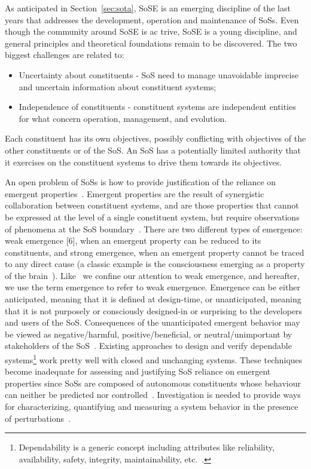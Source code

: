 As anticipated in Section~\ref{sec:sota}, SoSE is an emerging discipline of the last years that addresses the development,
operation and maintenance of SoSs. Even though the community around SoSE is ac trive, SoSE is a
young discipline, and general principles and theoretical foundations remain to be discovered. The two
biggest challenges are related to: 

\begin{itemize}
\item Uncertainty about constituents - SoS need to manage unavoidable imprecise
and uncertain information about constituent systems; 
\item Independence of constituents - constituent systems
are independent entities for what concern operation, management, and evolution. 
\end{itemize}

Each constituent has its own
objectives, possibly conflicting with objectives of the other constituents or of the SoS. An SoS has a potentially
limited authority that it exercises on the constituent systems to drive them towards its objectives. 

An open problem of SoSs is how to provide justification of the reliance on emergent properties~\cite{Fitzgerald2014}. Emergent
properties are the result of synergistic collaboration between constituent systems, and are those properties
that cannot be expressed at the level of a single constituent system, but require observations of phenomena at the
SoS boundary~\cite{Fitzgerald2014}. There are two different types of emergence: weak emergence [6], when an emergent property
can be reduced to its constituents, and strong emergence, when an emergent property cannot be traced to any
direct cause (a classic example is the consciousness emerging as a property of the brain~\cite{Fitzgerald2014}). Like~\cite{EmergenceAndRefinement,Fitzgerald2014}  we
confine our attention to weak emergence, and hereafter, we use the term emergence to refer to weak emergence.
Emergence can be either anticipated, meaning that it is defined at design-time, or unanticipated, meaning
that it is not purposely or consciously designed-in or surprising to the developers and users of the SoS. Consequences
of the unanticipated emergent behavior may be viewed as negative/harmful, positive/beneficial, or
neutral/unimportant by stakeholders of the SoS~\cite{DDUSA2012}. Existing approaches to design and verify dependable systems\footnote{Dependability is a generic concept including attributes like reliability, availability, safety, integrity, maintainability, etc.~\cite{dependability}.} 
work pretty well with closed and unchanging systems. These techniques become inadequate for assessing
and justifying SoS reliance on emergent properties since SoSs are composed of autonomous constituents
whose behaviour can neither be predicted nor controlled~\cite{Strigini12}. Investigation is needed to provide ways for characterizing, quantifying and measuring a system
behavior in the presence of perturbations~\cite{Strigini12}.

